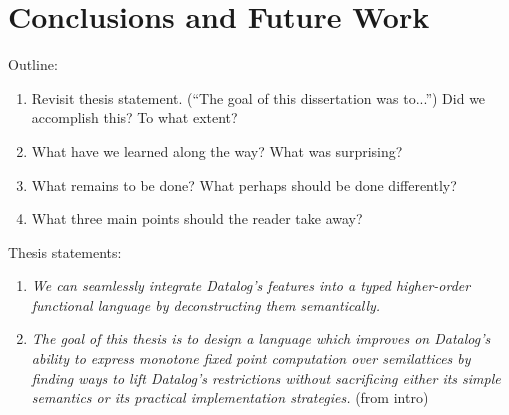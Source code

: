 \chapter{Conclusions and Future Work}
\label{chapter-conclusion}

\begingroup\todocolor Outline:

\begin{enumerate}
\item Revisit thesis statement. (``The goal of this dissertation was to...'') Did we accomplish this? To what extent?
\item What have we learned along the way? What was surprising?
\item What remains to be done? What perhaps should be done differently?
\item What three main points should the reader take away?
\end{enumerate}

\endgroup


Thesis statements:

\begin{enumerate}
\item \emph{We can seamlessly integrate Datalog's features into a typed higher-order functional language by deconstructing them semantically.}

\item \emph{The goal of this thesis is to design a language which improves on Datalog's ability to express monotone fixed point computation over semilattices by finding ways to lift Datalog's restrictions without sacrificing either its simple semantics or its practical implementation strategies.}
  {\small\sffamily (from intro)}

\end{enumerate}

